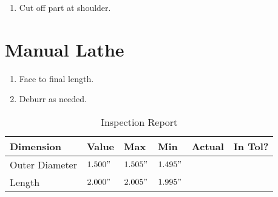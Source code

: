 \documentclass{article}
\begin{document}
\begin{enumerate}[resume]
	\item Cut off part at shoulder.
\end{enumerate}

\section*{Manual Lathe}

\begin{enumerate}[resume]
	\item Face to final length.
	
	\item Deburr as needed.
\end{enumerate}

\begin{table}[ht]
\centering
\caption{Inspection Report}

	\renewcommand\arraystretch{3}
	\begin{tabular}{l | m{2cm} | m{2cm} | m{2cm} | m{2cm} | m{2cm} |}
		Dimension & Value & Max & Min & Actual & In Tol? \\
		\hline
		Outer Diameter & $1.500"$ & $1.505"$ & $1.495"$ && \\
		\hline
		Length & $2.000"$ & $2.005"$ & $1.995"$ && \\ 
		\hline
	\end{tabular}
\end{table}
\end{document}
